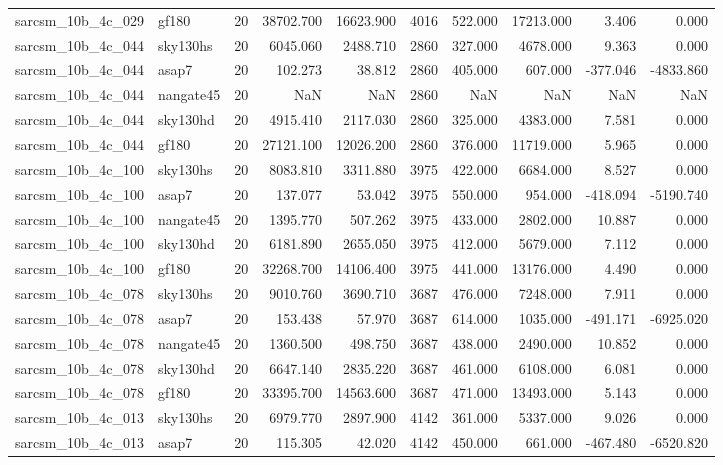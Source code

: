 \documentclass{article}
\begin{document}
\begin{longtable}{llrrrrrrrr}
sarcsm\_10b\_4c\_029 & gf180 & 20 & 38702.700 & 16623.900 & 4016 & 522.000 & 17213.000 & 3.406 & 0.000 \\
sarcsm\_10b\_4c\_044 & sky130hs & 20 & 6045.060 & 2488.710 & 2860 & 327.000 & 4678.000 & 9.363 & 0.000 \\
sarcsm\_10b\_4c\_044 & asap7 & 20 & 102.273 & 38.812 & 2860 & 405.000 & 607.000 & -377.046 & -4833.860 \\
sarcsm\_10b\_4c\_044 & nangate45 & 20 & NaN & NaN & 2860 & NaN & NaN & NaN & NaN \\
sarcsm\_10b\_4c\_044 & sky130hd & 20 & 4915.410 & 2117.030 & 2860 & 325.000 & 4383.000 & 7.581 & 0.000 \\
sarcsm\_10b\_4c\_044 & gf180 & 20 & 27121.100 & 12026.200 & 2860 & 376.000 & 11719.000 & 5.965 & 0.000 \\
sarcsm\_10b\_4c\_100 & sky130hs & 20 & 8083.810 & 3311.880 & 3975 & 422.000 & 6684.000 & 8.527 & 0.000 \\
sarcsm\_10b\_4c\_100 & asap7 & 20 & 137.077 & 53.042 & 3975 & 550.000 & 954.000 & -418.094 & -5190.740 \\
sarcsm\_10b\_4c\_100 & nangate45 & 20 & 1395.770 & 507.262 & 3975 & 433.000 & 2802.000 & 10.887 & 0.000 \\
sarcsm\_10b\_4c\_100 & sky130hd & 20 & 6181.890 & 2655.050 & 3975 & 412.000 & 5679.000 & 7.112 & 0.000 \\
sarcsm\_10b\_4c\_100 & gf180 & 20 & 32268.700 & 14106.400 & 3975 & 441.000 & 13176.000 & 4.490 & 0.000 \\
sarcsm\_10b\_4c\_078 & sky130hs & 20 & 9010.760 & 3690.710 & 3687 & 476.000 & 7248.000 & 7.911 & 0.000 \\
sarcsm\_10b\_4c\_078 & asap7 & 20 & 153.438 & 57.970 & 3687 & 614.000 & 1035.000 & -491.171 & -6925.020 \\
sarcsm\_10b\_4c\_078 & nangate45 & 20 & 1360.500 & 498.750 & 3687 & 438.000 & 2490.000 & 10.852 & 0.000 \\
sarcsm\_10b\_4c\_078 & sky130hd & 20 & 6647.140 & 2835.220 & 3687 & 461.000 & 6108.000 & 6.081 & 0.000 \\
sarcsm\_10b\_4c\_078 & gf180 & 20 & 33395.700 & 14563.600 & 3687 & 471.000 & 13493.000 & 5.143 & 0.000 \\
sarcsm\_10b\_4c\_013 & sky130hs & 20 & 6979.770 & 2897.900 & 4142 & 361.000 & 5337.000 & 9.026 & 0.000 \\
sarcsm\_10b\_4c\_013 & asap7 & 20 & 115.305 & 42.020 & 4142 & 450.000 & 661.000 & -467.480 & -6520.820 \\

\end{longtable}
\end{document}
